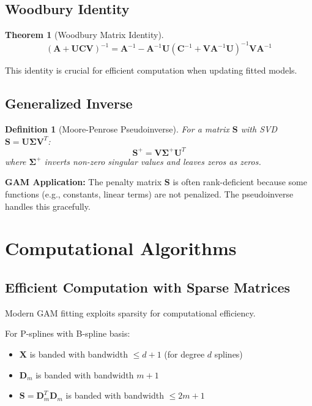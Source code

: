 \documentclass[12pt]{article}
\newtheorem{theorem}{Theorem}
\newtheorem{definition}{Definition}
\begin{document}
\subsection{Woodbury Identity}
\begin{theorem}[Woodbury Matrix Identity]
\begin{equation}
(\mathbf{A} + \mathbf{U}\mathbf{C}\mathbf{V})^{-1} = \mathbf{A}^{-1} - \mathbf{A}^{-1}\mathbf{U}(\mathbf{C}^{-1} + \mathbf{V}\mathbf{A}^{-1}\mathbf{U})^{-1}\mathbf{V}\mathbf{A}^{-1}
\end{equation}
\end{theorem}

This identity is crucial for efficient computation when updating fitted models.

\subsection{Generalized Inverse}
\begin{definition}[Moore-Penrose Pseudoinverse]
For a matrix $\mathbf{S}$ with SVD $\mathbf{S} = \mathbf{U}\bm{\Sigma}\mathbf{V}^T$:
\begin{equation}
\mathbf{S}^+ = \mathbf{V}\bm{\Sigma}^+\mathbf{U}^T
\end{equation}
where $\bm{\Sigma}^+$ inverts non-zero singular values and leaves zeros as zeros.
\end{definition}

\textbf{GAM Application:} The penalty matrix $\mathbf{S}$ is often rank-deficient because some functions (e.g., constants, linear terms) are not penalized. The pseudoinverse handles this gracefully.

\section{Computational Algorithms}

\subsection{Efficient Computation with Sparse Matrices}

Modern GAM fitting exploits sparsity for computational efficiency.

For P-splines with B-spline basis:
\begin{itemize}
    \item $\mathbf{X}$ is banded with bandwidth $\leq d+1$ (for degree $d$ splines)
    \item $\mathbf{D}_m$ is banded with bandwidth $m+1$
    \item $\mathbf{S} = \mathbf{D}_m^T\mathbf{D}_m$ is banded with bandwidth $\leq 2m+1$
\end{itemize}
\end{document}
